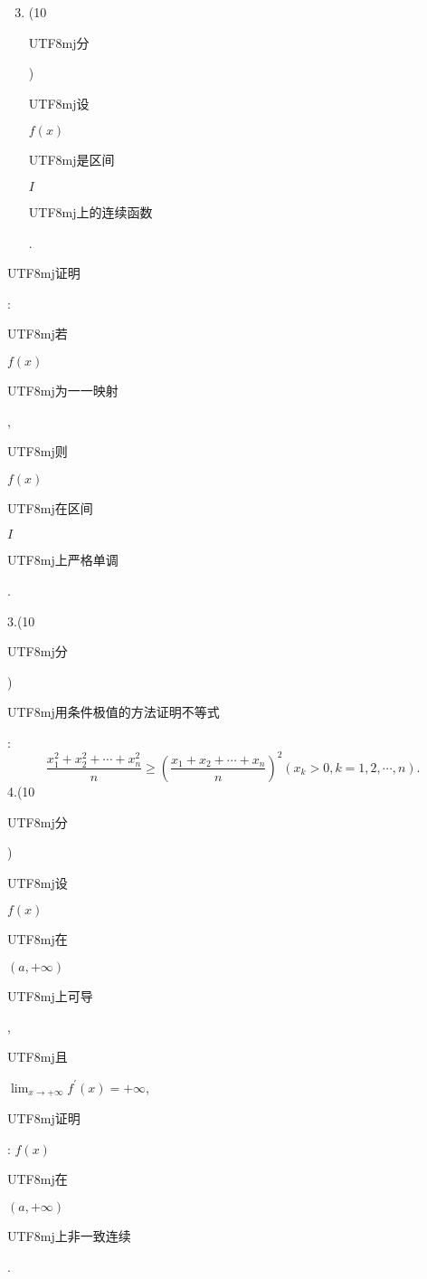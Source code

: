 \documentclass[10pt]{article}
\begin{document}
\begin{enumerate}
  \setcounter{enumi}{2}
  \item (10 \begin{CJK}{UTF8}{mj}分\end{CJK}) \begin{CJK}{UTF8}{mj}设\end{CJK} $f(x)$ \begin{CJK}{UTF8}{mj}是区间\end{CJK} $I$ \begin{CJK}{UTF8}{mj}上的连续函数\end{CJK}.
\end{enumerate}
\begin{CJK}{UTF8}{mj}证明\end{CJK}: \begin{CJK}{UTF8}{mj}若\end{CJK} $f(x)$ \begin{CJK}{UTF8}{mj}为一一映射\end{CJK}, \begin{CJK}{UTF8}{mj}则\end{CJK} $f(x)$ \begin{CJK}{UTF8}{mj}在区间\end{CJK} $I$ \begin{CJK}{UTF8}{mj}上严格单调\end{CJK}.

3.(10 \begin{CJK}{UTF8}{mj}分\end{CJK}) \begin{CJK}{UTF8}{mj}用条件极值的方法证明不等式\end{CJK}:
$$
\frac{x_{1}^{2}+x_{2}^{2}+\cdots+x_{n}^{2}}{n} \geqslant\left(\frac{x_{1}+x_{2}+\cdots+x_{n}}{n}\right)^{2}\left(x_{k}>0, k=1,2, \cdots, n\right) \text {. }
$$
4.(10 \begin{CJK}{UTF8}{mj}分\end{CJK}) \begin{CJK}{UTF8}{mj}设\end{CJK} $f(x)$ \begin{CJK}{UTF8}{mj}在\end{CJK} $(a,+\infty)$ \begin{CJK}{UTF8}{mj}上可导\end{CJK}, \begin{CJK}{UTF8}{mj}且\end{CJK} $\lim _{x \rightarrow+\infty} f^{\prime}(x)=+\infty$, \begin{CJK}{UTF8}{mj}证明\end{CJK}: $f(x)$ \begin{CJK}{UTF8}{mj}在\end{CJK} $(a,+\infty)$ \begin{CJK}{UTF8}{mj}上非一致连续\end{CJK}.
\end{document}
